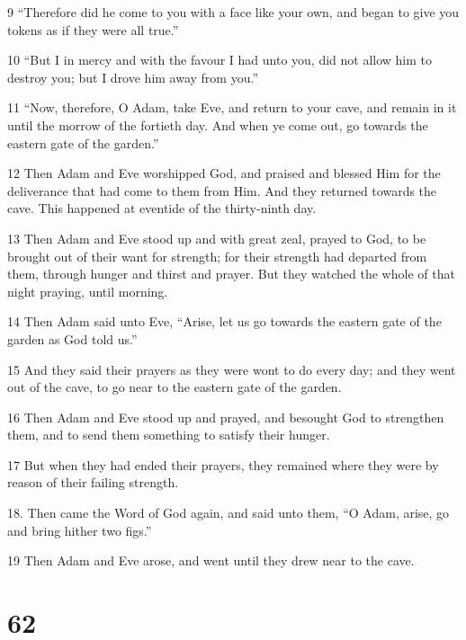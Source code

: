 \par 9 “Therefore did he come to you with a face like your own, and began to give you tokens as if they were all true.”

\par 10 “But I in mercy and with the favour I had unto you, did not allow him to destroy you; but I drove him away from you.”

\par 11 “Now, therefore, O Adam, take Eve, and return to your cave, and remain in it until the morrow of the fortieth day. And when ye come out, go towards the eastern gate of the garden.”

\par 12 Then Adam and Eve worshipped God, and praised and blessed Him for the deliverance that had come to them from Him. And they returned towards the cave. This happened at eventide of the thirty-ninth day.

\par 13 Then Adam and Eve stood up and with great zeal, prayed to God, to be brought out of their want for strength; for their strength had departed from them, through hunger and thirst and prayer. But they watched the whole of that night praying, until morning.

\par 14 Then Adam said unto Eve, “Arise, let us go towards the eastern gate of the garden as God told us.”

\par 15 And they said their prayers as they were wont to do every day; and they went out of the cave, to go near to the eastern gate of the garden.

\par 16 Then Adam and Eve stood up and prayed, and besought God to strengthen them, and to send them something to satisfy their hunger.

\par 17 But when they had ended their prayers, they remained where they were by reason of their failing strength.

\par 18. Then came the Word of God again, and said unto them, “O Adam, arise, go and bring hither two figs.”

\par 19 Then Adam and Eve arose, and went until they drew near to the cave.

\chapter{62}

